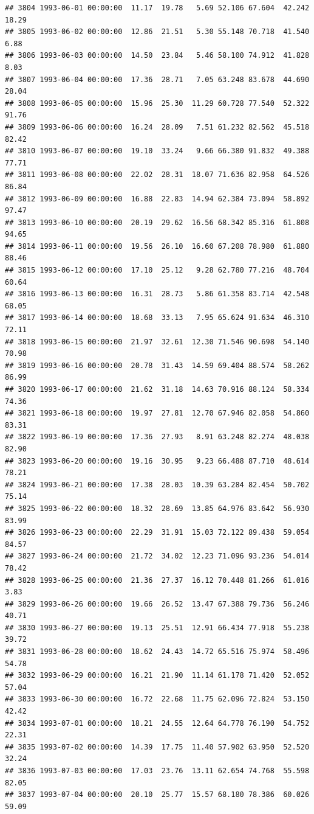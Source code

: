 \documentclass{article}\usepackage{graphicx, color}
\makeatletter
\newenvironment{kframe}{%
 \def\at@end@of@kframe{}%
 \ifinner\ifhmode%
  \def\at@end@of@kframe{\end{minipage}}%
  \begin{minipage}{\columnwidth}%
 \fi\fi%
 \def\FrameCommand##1{\hskip\@totalleftmargin \hskip-\fboxsep
 \colorbox{shadecolor}{##1}\hskip-\fboxsep
     \hskip-\linewidth \hskip-\@totalleftmargin \hskip\columnwidth}%
 \MakeFramed {\advance\hsize-\width
   \@totalleftmargin\z@ \linewidth\hsize
   \@setminipage}}%
 {\par\unskip\endMakeFramed%
 \at@end@of@kframe}
\newenvironment{knitrout}{}{} %
\makeatother
\begin{document}
\begin{knitrout}
\begin{kframe}
\begin{verbatim}
## 3804 1993-06-01 00:00:00  11.17  19.78   5.69 52.106 67.604  42.242  18.29
## 3805 1993-06-02 00:00:00  12.86  21.51   5.30 55.148 70.718  41.540   6.88
## 3806 1993-06-03 00:00:00  14.50  23.84   5.46 58.100 74.912  41.828   8.03
## 3807 1993-06-04 00:00:00  17.36  28.71   7.05 63.248 83.678  44.690  28.04
## 3808 1993-06-05 00:00:00  15.96  25.30  11.29 60.728 77.540  52.322  91.76
## 3809 1993-06-06 00:00:00  16.24  28.09   7.51 61.232 82.562  45.518  82.42
## 3810 1993-06-07 00:00:00  19.10  33.24   9.66 66.380 91.832  49.388  77.71
## 3811 1993-06-08 00:00:00  22.02  28.31  18.07 71.636 82.958  64.526  86.84
## 3812 1993-06-09 00:00:00  16.88  22.83  14.94 62.384 73.094  58.892  97.47
## 3813 1993-06-10 00:00:00  20.19  29.62  16.56 68.342 85.316  61.808  94.65
## 3814 1993-06-11 00:00:00  19.56  26.10  16.60 67.208 78.980  61.880  88.46
## 3815 1993-06-12 00:00:00  17.10  25.12   9.28 62.780 77.216  48.704  60.64
## 3816 1993-06-13 00:00:00  16.31  28.73   5.86 61.358 83.714  42.548  68.05
## 3817 1993-06-14 00:00:00  18.68  33.13   7.95 65.624 91.634  46.310  72.11
## 3818 1993-06-15 00:00:00  21.97  32.61  12.30 71.546 90.698  54.140  70.98
## 3819 1993-06-16 00:00:00  20.78  31.43  14.59 69.404 88.574  58.262  86.99
## 3820 1993-06-17 00:00:00  21.62  31.18  14.63 70.916 88.124  58.334  74.36
## 3821 1993-06-18 00:00:00  19.97  27.81  12.70 67.946 82.058  54.860  83.31
## 3822 1993-06-19 00:00:00  17.36  27.93   8.91 63.248 82.274  48.038  82.90
## 3823 1993-06-20 00:00:00  19.16  30.95   9.23 66.488 87.710  48.614  78.21
## 3824 1993-06-21 00:00:00  17.38  28.03  10.39 63.284 82.454  50.702  75.14
## 3825 1993-06-22 00:00:00  18.32  28.69  13.85 64.976 83.642  56.930  83.99
## 3826 1993-06-23 00:00:00  22.29  31.91  15.03 72.122 89.438  59.054  84.57
## 3827 1993-06-24 00:00:00  21.72  34.02  12.23 71.096 93.236  54.014  78.42
## 3828 1993-06-25 00:00:00  21.36  27.37  16.12 70.448 81.266  61.016   3.83
## 3829 1993-06-26 00:00:00  19.66  26.52  13.47 67.388 79.736  56.246  40.71
## 3830 1993-06-27 00:00:00  19.13  25.51  12.91 66.434 77.918  55.238  39.72
## 3831 1993-06-28 00:00:00  18.62  24.43  14.72 65.516 75.974  58.496  54.78
## 3832 1993-06-29 00:00:00  16.21  21.90  11.14 61.178 71.420  52.052  57.04
## 3833 1993-06-30 00:00:00  16.72  22.68  11.75 62.096 72.824  53.150  42.42
## 3834 1993-07-01 00:00:00  18.21  24.55  12.64 64.778 76.190  54.752  22.31
## 3835 1993-07-02 00:00:00  14.39  17.75  11.40 57.902 63.950  52.520  32.24
## 3836 1993-07-03 00:00:00  17.03  23.76  13.11 62.654 74.768  55.598  82.05
## 3837 1993-07-04 00:00:00  20.10  25.77  15.57 68.180 78.386  60.026  59.09

\end{verbatim}
\end{kframe}
\end{knitrout}
\end{document}
